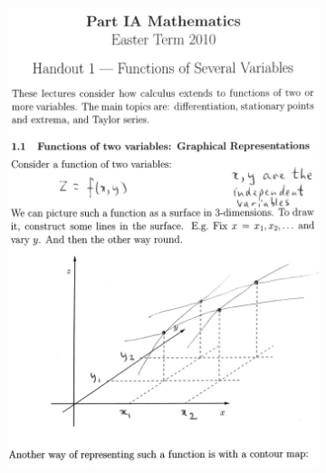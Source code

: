 \begin{figure}[!htb]
    \centering
    \begin{subfigure}{.47\textwidth}
        \includegraphics[width=\textwidth]{handout1.jpg}
    \end{subfigure}%
    \begin{subfigure}{.52\textwidth}

\end{subfigure}
\end{figure}
